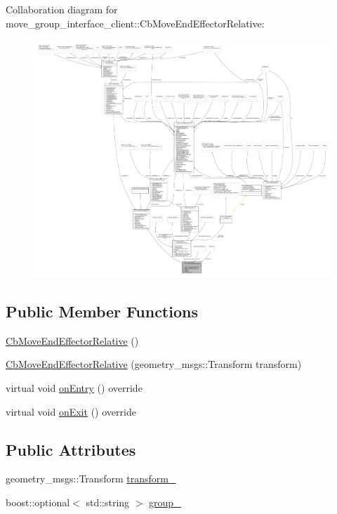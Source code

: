 Collaboration diagram for move\+\_\+group\+\_\+interface\+\_\+client\+:\+:Cb\+Move\+End\+Effector\+Relative\+:
\nopagebreak
\begin{figure}[H]
\begin{center}
\leavevmode
\includegraphics[width=350pt]{classmove__group__interface__client_1_1CbMoveEndEffectorRelative__coll__graph}
\end{center}
\end{figure}
\subsection*{Public Member Functions}
\begin{DoxyCompactItemize}
\item 
\hyperlink{classmove__group__interface__client_1_1CbMoveEndEffectorRelative_a935f6349f0ab3b762ed6365d35634a0b}{Cb\+Move\+End\+Effector\+Relative} ()
\item 
\hyperlink{classmove__group__interface__client_1_1CbMoveEndEffectorRelative_acd4b8a675f6f1d93dd342ed8a6570da8}{Cb\+Move\+End\+Effector\+Relative} (geometry\+\_\+msgs\+::\+Transform transform)
\item 
virtual void \hyperlink{classmove__group__interface__client_1_1CbMoveEndEffectorRelative_a54ba18388e200b43fda82a5f438d677e}{on\+Entry} () override
\item 
virtual void \hyperlink{classmove__group__interface__client_1_1CbMoveEndEffectorRelative_a30bceb2ccee1a91e82f2d6a275bd8581}{on\+Exit} () override
\end{DoxyCompactItemize}
\subsection*{Public Attributes}
\begin{DoxyCompactItemize}
\item 
geometry\+\_\+msgs\+::\+Transform \hyperlink{classmove__group__interface__client_1_1CbMoveEndEffectorRelative_a180b4e40316bc8d8d578c98b2fac068f}{transform\+\_\+}
\item 
boost\+::optional$<$ std\+::string $>$ \hyperlink{classmove__group__interface__client_1_1CbMoveEndEffectorRelative_a3165754a85fd7046e470a399f24d9fb6}{group\+\_\+}
\end{DoxyCompactItemize}
